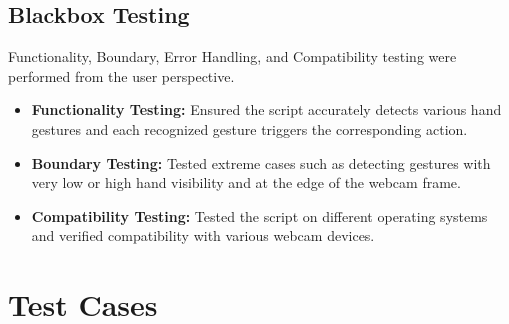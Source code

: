 \documentclass[12pt,a4paper]{report}
\begin{document}
\subsection{Blackbox Testing}

Functionality, Boundary, Error Handling, and Compatibility testing were performed from the
user perspective.

\begin{itemize}[noitemsep]
  \item \textbf{Functionality Testing:} Ensured the script accurately detects various hand
    gestures and each recognized gesture triggers the corresponding action.
  \item \textbf{Boundary Testing:} Tested extreme cases such as detecting gestures with very
    low or high hand visibility and at the edge of the webcam frame.
  \item \textbf{Compatibility Testing:} Tested the script on different operating systems and
    verified compatibility with various webcam devices.
\end{itemize}

\section{Test Cases}
\end{document}
